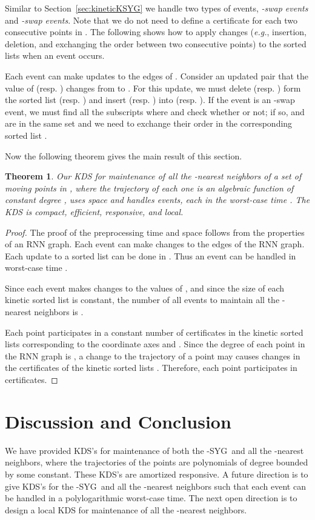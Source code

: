 \documentclass[preprint,12pt]{elsarticle}
\def\1syg{\mbox{-SYG}}
\newcommand{\eg}{\emph{e.g.}}
\newtheorem{theorem}{Theorem}[section]
\begin{document}
Similar to Section~\ref{sec:kineticKSYG} we handle two types of events, \textit{-swap events} and \textit{-swap events}. Note that we do not need to define a certificate for each two consecutive points in .  The following shows how to apply changes (\eg, insertion, deletion, and exchanging the order between two consecutive points) to the sorted lists  when an event occurs.

Each event can make  updates to the edges of . Consider an updated pair  that the value of  (resp. ) changes from  to . For this update, we must delete  (resp. ) form the sorted list  (resp. ) and insert  (resp. ) into  (resp. ). If the event is an -swap event, we must find all the subscripts  where  and check whether  or not; if so,  and  are in the same set  and we need to exchange their order in the corresponding sorted list . 

Now the following theorem gives the main result of this section. 


\begin{theorem}\label{the:KinEpsANN}
Our KDS for maintenance of all the -nearest neighbors of a set of  moving points in , where the trajectory of each one is an algebraic function of constant degree , uses  space and handles  events, each in the worst-case time . The KDS is compact, efficient, responsive, and local.
\end{theorem}
\begin{proof}
The proof of the preprocessing time and space follows from the properties of an RNN graph. Each event can make  changes to the edges of the RNN graph. Each update to a sorted list  can be done in . Thus an event can be handled in worst-case time .

Since each event makes  changes to the values of , and since the size of each kinetic sorted list  is constant, the number of all events to maintain all the -nearest neighbors is .

Each point participates in a constant number of certificates in the kinetic sorted lists corresponding to the coordinate axes  and . Since the degree of each point in the RNN graph is , a change to the trajectory of a point may causes  changes in the certificates of the kinetic sorted lists . Therefore, each point participates in  certificates.
\end{proof}
\section{Discussion and Conclusion}\label{sec:conclusion}
We have provided KDS's for  maintenance of both the \1syg~and all the -nearest neighbors, where the trajectories of the points are polynomials of degree bounded by some constant. These KDS's are amortized responsive. A future direction is to give KDS's for the \1syg~and all the -nearest neighbors such that each event can be handled in a polylogarithmic worst-case time. The next open direction is to design a local KDS for maintenance of all the -nearest neighbors.
\end{document}
